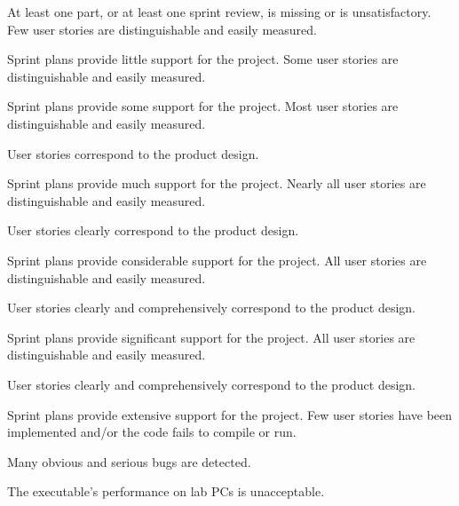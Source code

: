 \documentclass{../../fal_assignment}
\begin{document}
\rubricyeartwo
\begin{markingrubric}
		\grade\fail At least one part, or at least one sprint review, is missing or is unsatisfactory.
%
        \grade \fail Few user stories are distinguishable and easily measured.
            \par Sprint plans provide little support for the project.
        \grade Some user stories are distinguishable and easily measured.
            \par Sprint plans provide some support for the project.
        \grade Most user stories are distinguishable and easily measured.
            \par User stories correspond to the product design.
            \par Sprint plans provide much support for the project.
        \grade Nearly all user stories are distinguishable and easily measured.
            \par User stories clearly correspond to the product design.
            \par Sprint plans provide considerable support for the project.
        \grade All user stories are distinguishable and easily measured.
            \par User stories clearly and comprehensively correspond to the product design.
            \par Sprint plans provide significant support for the project.
        \grade All user stories are distinguishable and easily measured.
            \par User stories clearly and comprehensively correspond to the product design.
            \par Sprint plans provide extensive support for the project.
%
        \grade \fail Few user stories have been implemented  and/or the code fails to compile or run.
            \par Many obvious and serious bugs are detected.
            \par The executable's performance on lab PCs is unacceptable.

\end{markingrubric}
\end{document}
